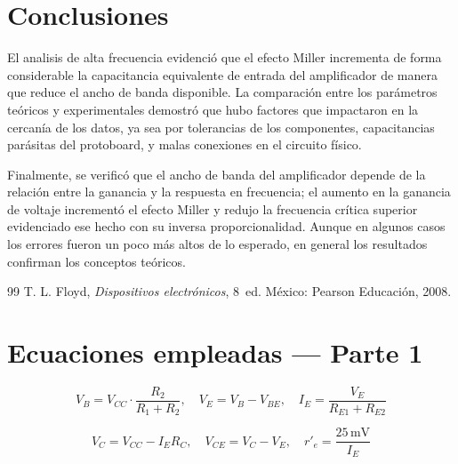 \documentclass[journal]{IEEEtran}
\begin{document}
\section{Conclusiones}

El analisis de alta frecuencia evidenció que el efecto Miller incrementa de forma considerable la capacitancia equivalente de entrada del amplificador de manera que reduce el ancho de banda disponible. La comparación entre los parámetros teóricos y experimentales demostró que hubo factores que impactaron en la cercanía de los datos, ya sea por tolerancias de los componentes, capacitancias parásitas del protoboard, y malas conexiones en el circuito físico.

Finalmente, se verificó que el ancho de banda del amplificador depende de la relación entre la ganancia y la respuesta en frecuencia; el aumento en la ganancia de voltaje incrementó el efecto Miller y redujo la frecuencia crítica superior evidenciado ese hecho con su inversa proporcionalidad. Aunque en algunos casos los errores fueron un poco más altos de lo esperado, en general los resultados confirman los conceptos teóricos.

\renewcommand\refname{Referencias}
\begin{thebibliography}{99}
T. L. Floyd, \textit{Dispositivos electr\'onicos}, 8\textordfeminine~ed. M\'exico: Pearson Educaci\'on, 2008.

\end{thebibliography}


\appendices
\renewcommand\appendixname{Ap\'endice}
\section{Ecuaciones empleadas --- Parte 1}
\label{apx:ec_p1}

\begin{equation*}
    V_B = V_{CC} \cdot \frac{R_2}{R_1 + R_2}, \quad
    V_E = V_B - V_{BE}, \quad
    I_E = \frac{V_E}{R_{E1} + R_{E2}}
\end{equation*}

\begin{equation*}
    V_C = V_{CC} - I_E R_C, \quad
    V_{CE} = V_C - V_E, \quad
    r'_e = \frac{25\,\text{mV}}{I_E}
\end{equation*}
\end{document}
